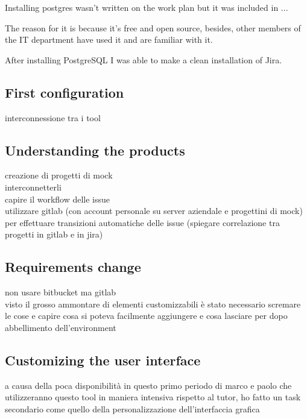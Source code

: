 	Installing postgres wasn't written on the work plan but it was included in ... 
	
	
	The reason for it is because it's free and open source, besides, other members of the IT department have used it and are familiar with it.
	
	After installing PostgreSQL I was able to make a clean installation of Jira.
	
	








	\subsection{First configuration}
		interconnessione tra i tool
	
	\subsection{Understanding the products}
		creazione di progetti di mock\\
		interconnetterli\\
		capire il workflow delle issue\\
		utilizzare gitlab (con account personale su server aziendale e progettini di mock) per effettuare transizioni automatiche delle issue (spiegare correlazione tra progetti in gitlab e in jira)

	\subsection{Requirements change}
		non usare bitbucket ma gitlab\\
		visto il grosso ammontare di elementi customizzabili è stato necessario scremare le cose e capire cosa si poteva facilmente aggiungere e cosa lasciare per dopo\\
		abbellimento dell'environment
		

	\subsection{Customizing the user interface}
		a causa della poca disponibilità in questo primo periodo di marco e paolo che utilizzeranno questo tool in maniera intensiva rispetto al tutor, ho fatto un task secondario come quello della personalizzazione dell'interfaccia grafica
	
